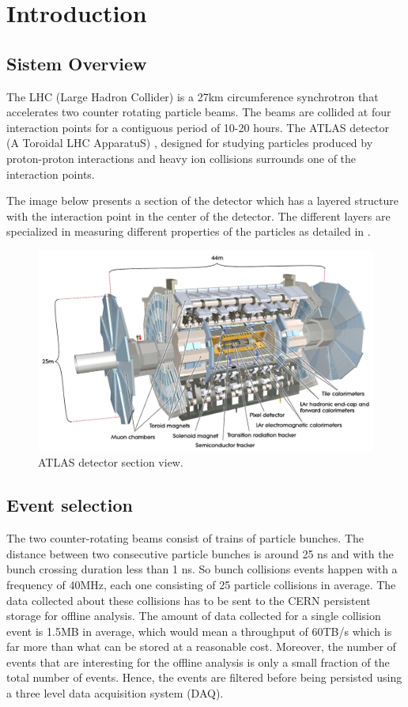 \chapter{Introduction} %
\label{Capitolul1}

\section*{Sistem Overview}
The LHC (Large Hadron Collider) is a 27km circumference synchrotron that accelerates two counter rotating particle beams. The beams are collided at four interaction points for a contiguous period of 10-20 hours. The ATLAS detector (A Toroidal LHC ApparatuS) \citep{aad2008atlas}, designed for studying particles produced by proton-proton interactions and heavy ion collisions surrounds one of the interaction points. 

The image below presents a section of the detector which has a layered structure with the interaction point in the center of the detector. The different layers are specialized in measuring different properties of the particles as detailed in \citep{aad2008atlas}. 

\begin{figure}[ht!]
\centering
\includegraphics[scale=0.2]{Images/Overview.jpg}
\caption{ATLAS detector section view.}
\end{figure}


\section*{Event selection}
The two counter-rotating beams consist of trains of particle bunches. The distance between two consecutive particle bunches is around 25 ns and with the bunch crossing duration less than 1 ns. So bunch collisions events happen with a frequency of 40MHz, each one consisting of 25 particle collisions in average. The data collected about these collisions has to be sent to the CERN persistent storage \citep{baud2003castor} for offline analysis. The amount of data collected for a single collision event is 1.5MB in average, which would mean a throughput of 60TB/s which is far more than what can be stored at a reasonable cost. Moreover, the number of events that are interesting for the offline analysis is only a small fraction of the total number of events. Hence, the events are filtered before being persisted using a three level data acquisition system (DAQ). 

